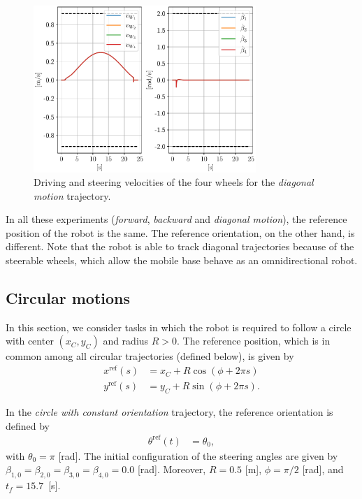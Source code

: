 \begin{figure}
    \centering
    \includegraphics[width=0.75\textwidth]{figures/SWMR/simulations/diagonal/wheels_velocities.pdf}
    \caption{Driving and steering velocities of the four wheels for the \textit{diagonal motion} trajectory.}
    \label{fig:simulations:diagonal:wheel-velocities}
\end{figure}

In all these experiments (\textit{forward}, \textit{backward} and \textit{diagonal motion}), the reference position of the robot is the same. The reference orientation, on the other hand, is different. Note that the robot is able to track diagonal trajectories because of the steerable wheels, which allow the mobile base behave as an omnidirectional robot.

\subsection{Circular motions}
In this section, we consider tasks in which the robot is required to follow a circle with center $(x_C, y_C)$ and radius $R > 0$. The reference position, which is in common among all circular trajectories (defined below), is given by
\begin{subequations}
    \begin{align*}
        x^{\mathrm{ref}}(s) &= x_C + R \cos(\phi + 2 \pi s) \\
        y^{\mathrm{ref}}(s) &= y_C + R \sin(\phi + 2 \pi s).
    \end{align*} 
\end{subequations}

In the \textit{circle with constant orientation} trajectory, the reference orientation is defined by
\begin{subequations}
\begin{align*}
    \theta^{\mathrm{ref}}(t) &= \theta_0,
\end{align*}
\end{subequations}
with $\theta_0=\pi$ [rad]. The initial configuration of the steering angles are given by$\beta_{1,0}=\beta_{2,0}=\beta_{3,0}=\beta_{4,0}=0.0$ [rad]. Moreover, $R=0.5$ [m], $\phi=\pi/2$ [rad], and $t_f=15.7$~[s].

